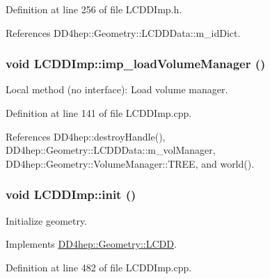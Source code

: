 Definition at line 256 of file LCDDImp.h.

References DD4hep::Geometry::LCDDData::m\_\-idDict.\hypertarget{class_d_d4hep_1_1_geometry_1_1_l_c_d_d_imp_af1c734df7d03b3e7903e1c25c508d153}{
\subsubsection[{imp\_\-loadVolumeManager}]{\setlength{\rightskip}{0pt plus 5cm}void LCDDImp::imp\_\-loadVolumeManager ()}}
\label{class_d_d4hep_1_1_geometry_1_1_l_c_d_d_imp_af1c734df7d03b3e7903e1c25c508d153}


Local method (no interface): Load volume manager. 

Definition at line 141 of file LCDDImp.cpp.

References DD4hep::destroyHandle(), DD4hep::Geometry::LCDDData::m\_\-volManager, DD4hep::Geometry::VolumeManager::TREE, and world().\hypertarget{class_d_d4hep_1_1_geometry_1_1_l_c_d_d_imp_af0cf7ab83180ee15085bcc7e1383f561}{
\subsubsection[{init}]{\setlength{\rightskip}{0pt plus 5cm}void LCDDImp::init ()}}
\label{class_d_d4hep_1_1_geometry_1_1_l_c_d_d_imp_af0cf7ab83180ee15085bcc7e1383f561}


Initialize geometry. 

Implements \hyperlink{class_d_d4hep_1_1_geometry_1_1_l_c_d_d_a9a4f55004e7375b2b20fb64e1a7ee8de}{DD4hep::Geometry::LCDD}.

Definition at line 482 of file LCDDImp.cpp.

